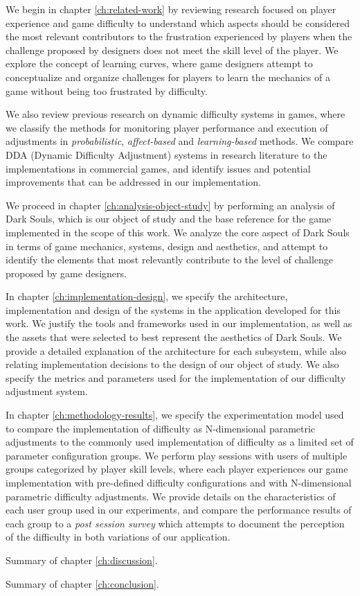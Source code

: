 We begin in chapter \ref{ch:related-work} by reviewing research focused on player experience and game difficulty to understand which aspects should be considered the most relevant contributors to the frustration experienced by players when the challenge proposed by designers does not meet the skill level of the player. We explore the concept of learning curves, where game designers attempt to conceptualize and organize challenges for players to learn the mechanics of a game without being too frustrated by difficulty.

We also review previous research on dynamic difficulty systems in games, where we classify the methods for monitoring player performance and execution of adjustments in \emph{probabilistic}, \emph{affect-based} and \emph{learning-based} methods. We compare DDA (Dynamic Difficulty Adjustment) systems in research literature to the implementations in commercial games, and identify issues and potential improvements that can be addressed in our implementation.

We proceed in chapter \ref{ch:analysis-object-study} by performing an analysis of Dark Souls, which is our object of study and the base reference for the game implemented in the scope of this work. We analyze the core aspect of Dark Souls in terms of game mechanics, systems, design and aesthetics, and attempt to identify the elements that most relevantly contribute to the level of challenge proposed by game designers.

In chapter \ref{ch:implementation-design}, we specify the architecture, implementation and design of the systems in the application developed for this work. We justify the tools and frameworks used in our implementation, as well as the assets that were selected to best represent the aesthetics of Dark Souls. We provide a detailed explanation of the architecture for each subsystem, while also relating implementation decisions to the design of our object of study. We also specify the metrics and parameters used for the implementation of our difficulty adjustment system.

In chapter \ref{ch:methodology-results}, we specify the experimentation model used to compare the implementation of difficulty as N-dimensional parametric adjustments to the commonly used implementation of difficulty as a limited set of parameter configuration groups. We perform play sessions with users of multiple groups categorized by player skill levels, where each player experiences our game implementation with pre-defined difficulty configurations and with N-dimensional parametric difficulty adjustments. We provide details on the characteristics of each user group used in our experiments, and compare the performance results of each group to a \emph{post session survey} which attempts to document the perception of the difficulty in both variations of our application.

Summary of chapter \ref{ch:discussion}.

Summary of chapter \ref{ch:conclusion}.
